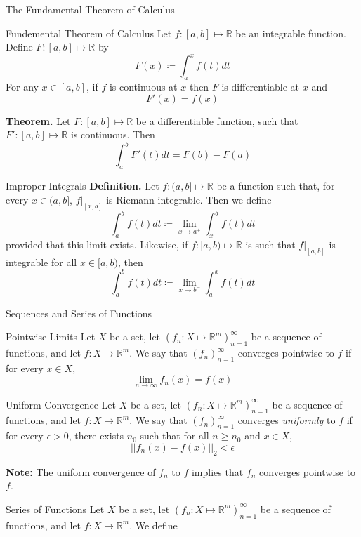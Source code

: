 \documentclass{article}
\newcommand{\real}{\mathbb{R}}
\begin{document}
\begin{multicols*}{3}
\begin{blackbox}{The Fundamental Theorem of Calculus}
\begin{bluebox}{Fundemental Theorem of Calculus}
    Let $f: [a,b] \mapsto \real$ be an integrable function. Define $F: [a,b] \mapsto \real$ by
    \[F(x) \coloneqq \int_a^x f(t)dt\]
    For any $x \in [a,b]$, if $f$ is continuous at $x$ then $F$ is differentiable at $x$ and 
    \[F'(x) = f(x)\]
    \end{bluebox}
\textbf{Theorem.} Let $F: [a,b]\mapsto \real$ be a differentiable function, such that $F': [a,b]\mapsto \real$ is continuous. Then
\[\int_a^b F'(t)dt = F(b) - F(a)\]
\end{blackbox}
\begin{blackbox}{Improper Integrals}
    \textbf{Definition.} Let $f: (a,b] \mapsto \real$ be a function such that, for every $x \in (a,b]$, $f|_{[x,b]}$ is Riemann integrable. Then we define
    \[\int_a^b f(t) dt \coloneqq \lim_{x \rightarrow a^+} \int_x^b f(t) dt\]
    provided that this limit exists. Likewise, if $f: [a,b) \mapsto \real$ is such that $f|_{[a,b]}$ is integrable for all $x \in [a,b)$, then \\[1.6ex]
    \[\int_a^b f(t) dt \coloneqq \lim_{x\rightarrow b^-} \int_a^x f(t) dt\]
\end{blackbox}
\begin{blackbox}{Sequences and Series of Functions}
    \begin{bluebox}{Pointwise Limits}
        Let $X$ be a set, let $(f_n: X \mapsto \real^m)_{n=1}^\infty$ be a sequence of functions, and let $f: X \mapsto \real^m$. We say that $(f_n)_{n=1}^\infty$ converges pointwise to $f$ if for every $x \in X$, 
        \[\lim_{n\rightarrow \infty}f_n(x) = f(x)\]
    \end{bluebox}
    \begin{pinkbox}{Uniform Convergence}
         Let $X$ be a set, let $(f_n: X \mapsto \real^m)_{n=1}^\infty$ be a sequence of functions, and let $f: X \mapsto \real^m$. We say that $(f_n)_{n=1}^\infty$ converges \emph{uniformly} to $f$ if for every $\epsilon > 0$, there exists $n_0$ such that for all $ n \geq n_0$ and $x \in X$, 
         \[||f_n(x) - f(x)||_2 < \epsilon\]
    \end{pinkbox}
    \begin{center}
    \textbf{Note: }The uniform convergence of $f_n$ to $f$ implies that $f_n$ converges pointwise to $f$.
    \end{center}
\end{blackbox}
\begin{blackbox}{Series of Functions}
    Let $X$ be a set, let $(f_n: X \mapsto \real^m)_{n=1}^\infty$ be a sequence of functions, and let $f: X \mapsto \real^m$. We define \\[-2ex]

\end{blackbox}
\end{multicols*}
\end{document}
